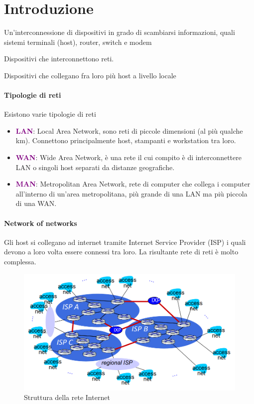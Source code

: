 \section{Introduzione}
    \begin{definition}[Rete]
        Un’interconnessione di dispositivi in grado di scambiarsi
        informazioni, quali sistemi terminali (host), router, switch e modem
    \end{definition} 

    \begin{definition}[Router]
        Dispositivi che interconnettono reti.
    \end{definition} 

    \begin{definition}[Switch]
        Dispositivi che collegano fra loro più host a livello locale
    \end{definition}

    \paragraph*{Tipologie di reti} Esistono varie tipologie di reti
        \begin{itemize}
            \item \textbf{\textcolor{purple}{LAN}}: Local Area Network, sono reti di piccole dimensioni (al più qualche km). Connettono principalmente host, stampanti e workstation tra loro.
            \item \textbf{\textcolor{purple}{WAN}}: Wide Area Network, è una rete il cui compito è di interconnettere LAN o singoli host separati da distanze geografiche.
            \item \textbf{\textcolor{purple}{MAN}}: Metropolitan Area Network, rete di computer che collega i computer all'interno di un'area metropolitana, più grande di una LAN ma più piccola di una WAN.
        \end{itemize}

    \paragraph*{Network of networks} Gli host si collegano ad internet tramite Internet Service Provider (ISP) i quali devono a loro volta essere connessi tra loro. La risultante rete di reti è molto complessa.
    \begin{figure}[h]
        \centering
        \includegraphics[scale=0.35]{Immagini/Rete-di-Reti.png}
        \caption{Struttura della rete Internet}
    \end{figure}
    